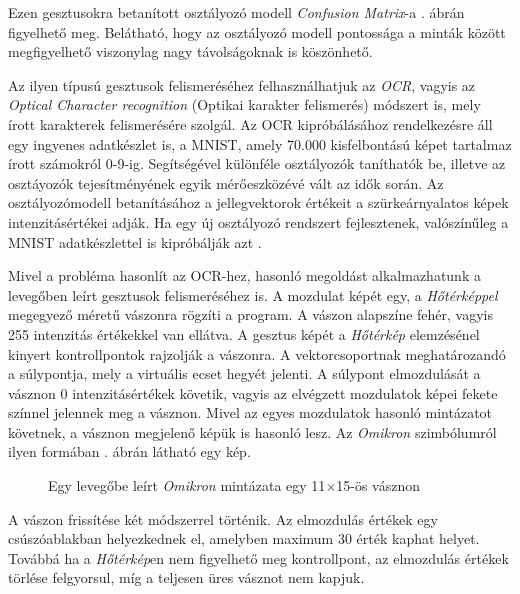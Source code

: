 Ezen gesztusokra betanított osztályozó modell \textit{Confusion Matrix}-a . ábrán figyelhető meg. Belátható, hogy az osztályozó modell pontossága a minták között megfigyelhető viszonylag nagy távolságoknak is köszönhető.

Az ilyen típusú gesztusok felismeréséhez felhasználhatjuk az \textit{OCR}, vagyis az \textit{Optical Character recognition} (Optikai karakter felismerés) módszert is, mely írott karakterek felismerésére szolgál. 
Az OCR kipróbálásához rendelkezésre áll egy ingyenes adatkészlet is, a MNIST, amely 70.000 kisfelbontású képet tartalmaz írott számokról 0-9-ig. Segítségével különféle osztályozók taníthatók be, illetve az osztáyozók tejesítményének egyik mérőeszközévé vált az idők során. Az osztályozómodell betanításához a jellegvektorok értékeit a szürkeárnyalatos képek intenzitásértékei adják. Ha egy új osztályozó rendszert fejlesztenek, valószínűleg a MNIST adatkészlettel is kipróbálják azt \cite{geron2019hands}.

Mivel a probléma hasonlít az OCR-hez, hasonló megoldást alkalmazhatunk a levegőben leírt gesztusok felismeréséhez is. A mozdulat képét egy, a \textit{Hőtérképpel} megegyező méretű vászonra rögzíti a program. A vászon alapszíne fehér, vagyis 255 intenzitás értékekkel van ellátva. A gesztus képét a \textit{Hőtérkép} elemzésénel kinyert kontrollpontok rajzolják a vászonra. A vektorcsoportnak meghatározandó a súlypontja, mely a virtuális ecset hegyét jelenti. A súlypont elmozdulását a vásznon 0 intenzitásértékek követik, vagyis az elvégzett mozdulatok képei fekete színnel jelennek meg a vásznon. Mivel az egyes mozdulatok hasonló mintázatot követnek, a vásznon megjelenő képük is hasonló lesz. Az \textit{Omikron} szimbólumról ilyen formában . ábrán látható egy kép.

\begin{figure}[h]
\centering
{}
\caption{Egy levegőbe leírt \textit{Omikron} mintázata egy 11$\times$15-ös vásznon}
\label{fig:ocr-gesture}
\end{figure}

A vászon frissítése két módszerrel történik. Az elmozdulás értékek egy csúszóablakban helyezkednek el, amelyben maximum  30 érték kaphat helyet. Továbbá ha a \textit{Hőtérkép}en nem figyelhető meg kontrollpont, az elmozdulás értékek törlése felgyorsul, míg a teljesen üres vásznot nem kapjuk.

